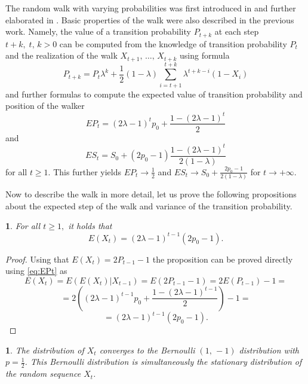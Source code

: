 \documentclass{amsart}
\theoremstyle{definition}
\theoremstyle{plain}
\newtheorem{prop}[thm]{\protect\propositionname}
\theoremstyle{plain}
\newtheorem{cor}[thm]{\protect\corollaryname}
\theoremstyle{plain}
\numberwithin{equation}{section}
\providecommand{\corollaryname}{Corollary}
\providecommand{\propositionname}{Proposition}
\begin{document}
The random walk with varying probabilities was first introduced in
\cite{ja2017ddny} and further elaborated in \cite{ja2019teze}.
Basic properties of the walk were also described in the previous
work. Namely, the value of a transition probability $P_{t+k}$ at
each step $t+k,\;t,\,k>0$ can be computed from the knowledge of
transition probability $P_{t}$ and the realization of the walk
$X_{t+1},\,\dots,\,X_{t+k}$ using formula
\begin{equation}
P_{t+k}=P_{t}\lambda^{k}+\frac{1}{2}(1-\lambda)\sum_{i=t+1}^{t+k}\lambda^{t+k-i}(1-X_{i})\label{eq:Pt}
\end{equation} and further formulas to compute the expected value of transition probability and position of the walker
\begin{equation}
EP_{t}=(2\lambda-1)^{t}p_{0}+\frac{1-(2\lambda-1)^{t}}{2}\label{eq:EPt}
\end{equation}
and
\begin{equation}
ES_{t}=S_{0}+(2p_{0}-1)\frac{1-(2\lambda-1)^{t}}{2(1-\lambda)}\label{eq:ESt}
\end{equation}
 for all $t\geq1$. This further yields $EP_{t}\rightarrow\frac{1}{2}$
and $ES_{t}\rightarrow S_{0}+\frac{2p_{0}-1}{2(1-\lambda)}$ for $t\rightarrow+\infty$.

Now to describe the walk in more detail, let us
prove the following propositions about the expected step
of the walk and variance of the transition probability.

\begin{prop}\label{PropEXt-succes}
For all $t\geq1,$ it holds that
\begin{equation}
E(X_{t})=(2\lambda-1)^{t-1}(2p_{0}-1).
\end{equation}
\end{prop}
\begin{proof}
Using that $E(X_{t})=2P_{t-1}-1$ the proposition can be
proved directly using \eqref{eq:EPt} as
\[
E(X_{t})=E(E(X_{t})|X_{t-1})=E(2P_{t-1}-1)=2E(P_{t-1})-1=
\]
\[
=2((2\lambda-1)^{t-1}p_{0}+\frac{1-(2\lambda-1)^{t-1}}{2})-1=
\]
\[
=(2\lambda-1)^{t-1}(2p_{0}-1).
\]
\end{proof}

\begin{cor}
\label{cor-stac-dist}
The distribution of $X_t$ converges to the Bernoulli $(1,\,-1)$ distribution with
$p=\frac{1}{2}$. This Bernoulli distribution is simultaneously the stationary distribution of the random sequence $X_t$.
\end{cor}
\end{document}
